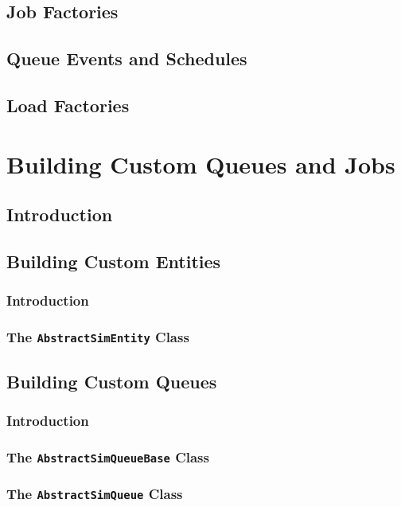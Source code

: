 \documentclass[12pt]{book}
\begin{document}
\section{Job Factories}

\section{Queue Events and Schedules}

\section{Load Factories}

\chapter{Building Custom Queues and Jobs}

\section{Introduction}

\section{Building Custom Entities}

\subsection{Introduction}

\subsection{The \lstinline{AbstractSimEntity} Class}

\section{Building Custom Queues}

\subsection{Introduction}

\subsection{The \lstinline{AbstractSimQueueBase} Class}

\subsection{The \lstinline{AbstractSimQueue} Class}
\end{document}
